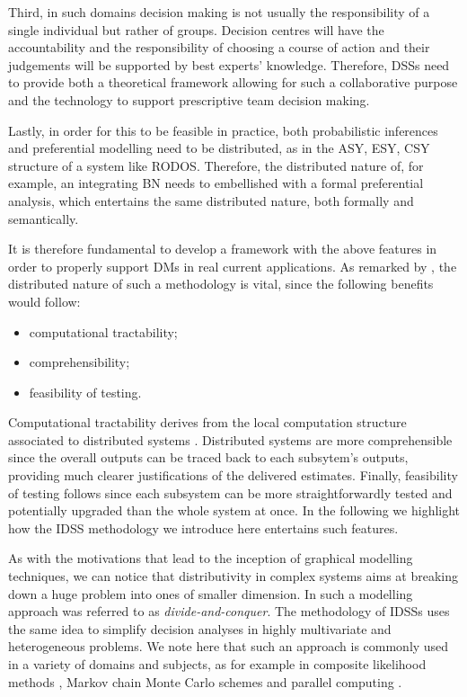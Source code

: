 Third, in such domains decision making is not usually the responsibility of a single individual but rather of groups. Decision centres will have the accountability and the responsibility of choosing a course of action and their judgements will be supported by best experts' knowledge. Therefore, DSSs need  to provide both a theoretical framework allowing for such a collaborative purpose and the technology  to support prescriptive team decision making.   

Lastly, in order for this to be feasible in practice, both probabilistic inferences and preferential modelling need to be distributed, as in the ASY, ESY, CSY structure of a system like RODOS. Therefore, the distributed nature of, for example, an integrating BN needs to embellished with a formal preferential analysis, which entertains the same distributed nature, both formally and semantically. 

It is therefore fundamental to develop a framework with the above features in order to properly support DMs in real current applications. As remarked by \citet{Mahoney1996}, the distributed nature of such a methodology is vital, since the following benefits would follow:
\begin{itemize}
\item computational tractability;
\item comprehensibility;
\item feasibility of testing.
\end{itemize}
Computational tractability derives from the local computation structure associated to distributed systems \citep[widely studied in machine learning, see e.g.][]{Peteiro2013,Rodriguez2011}. Distributed systems are more comprehensible since the overall outputs can be traced back to each subsytem's outputs, providing much clearer justifications of the delivered estimates. Finally, feasibility of testing follows since each subsystem can be more straightforwardly tested and potentially upgraded than the whole system at once.  In the following we highlight how the IDSS methodology we introduce here entertains such features.

As with the motivations that lead to the inception of graphical modelling techniques, we can notice that distributivity in complex systems aims at breaking down   a huge problem into ones of smaller dimension. In \citet{Spiegelhalter1993} such a modelling approach was referred to as \textit{divide-and-conquer}. The methodology of IDSSs uses the same idea to simplify decision analyses in highly multivariate and heterogeneous problems. We note here that such an approach is commonly used in a variety of domains and subjects, as for example in composite likelihood methods \citep{Varin2011}, Markov chain Monte Carlo  schemes \citep{Lindsten2014} and parallel computing \citep{Chandy1998}.   

